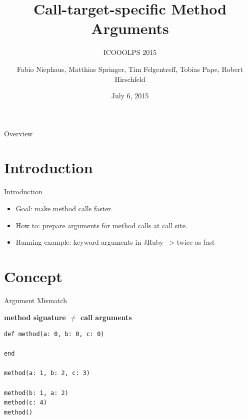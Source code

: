 \documentclass[xcolor=dvipsname]{beamer} %
\title{Call-target-specific Method Arguments}
\subtitle{ICOOOLPS 2015}
\author{Fabio Niephaus, Matthias Springer, Tim Felgentreff, Tobias Pape, Robert Hirschfeld}
\date{July 6, 2015}
\institute[2012]{Hasso Plattner Institute, Software Architecture Group}
\begin{document}
\begin{frame}[plain]
	\maketitle
\end{frame}
\begin{frame}{Overview}
	\tableofcontents[hideallsubsections]
\end{frame}

\section{Introduction}
\begin{frame}{Introduction}
	\begin{itemize}
		\item Goal: make method calls faster.
		\item How to: prepare arguments for method calls at call site.
		\item Running example: keyword arguments in JRuby --> twice as fast
	\end{itemize}
\end{frame}

\section{Concept}
\begin{frame}[fragile]{Argument Mismatch}
\begin{table}
	\centering
	\textbf{method signature $\not=$ call arguments}
\end{table}

\begin{table}
\begin{minipage}{0.8\textwidth}
\begin{lstlisting}
def method(a: 0, b: 0, c: 0)

end

method(a: 1, b: 2, c: 3)

method(b: 1, a: 2)
method(c: 4)
method()
\end{lstlisting}
\end{minipage} %
\begin{minipage}{0.45\textwidth}
\end{minipage}
\end{table}
\end{frame}
\end{document}
